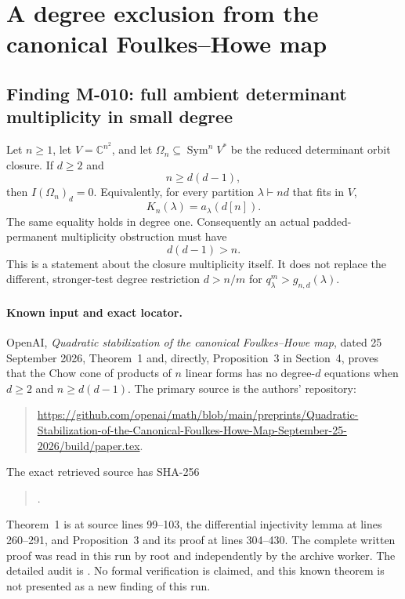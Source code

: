 \section{A degree exclusion from the canonical Foulkes--Howe map}

\subsection*{Finding M-010: full ambient determinant multiplicity in small degree}
Let \(n\geq1\), let \(V=\mathbb C^{n^2}\), and let
\(\Omega_n\subseteq\operatorname{Sym}^nV^*\) be the reduced
determinant orbit closure. If \(d\geq2\) and
\[
                              n\geq d(d-1),
\]
then \(I(\Omega_n)_d=0\). Equivalently, for every partition
\(\lambda\vdash nd\) that fits in \(V\),
\begin{equation}\label{eq:M010}
                         K_n(\lambda)=a_\lambda(d[n]).
\end{equation}
The same equality holds in degree one. Consequently an actual
padded-permanent multiplicity obstruction must have
\[
                              d(d-1)>n.
\]
This is a statement about the closure multiplicity itself. It does
not replace the different, stronger-test degree restriction
\(d>n/m\) for \(q^m_\lambda>g_{n,d}(\lambda)\).

\paragraph{Known input and exact locator.}
OpenAI, \emph{Quadratic stabilization of the canonical
Foulkes--Howe map}, dated 25 September 2026,
Theorem~1 and, directly, Proposition~3 in Section~4, proves that
the Chow cone of products of \(n\) linear forms has no degree-\(d\)
equations when \(d\geq2\) and \(n\geq d(d-1)\).
The primary source is the authors' repository:
\begin{quote}\small
\url{https://github.com/openai/math/blob/main/preprints/Quadratic-Stabilization-of-the-Canonical-Foulkes-Howe-Map-September-25-2026/build/paper.tex}.
\end{quote}
The exact retrieved source has SHA-256
\begin{quote}\small{}.
\end{quote}
Theorem~1 is at source lines 99--103, the differential injectivity
lemma at lines 260--291, and Proposition~3 and its proof at
lines 304--430. The complete written proof was read in this run
by root and independently by the archive worker. The detailed
audit is .
No formal verification is claimed, and this known theorem is
not presented as a new finding of this run.


